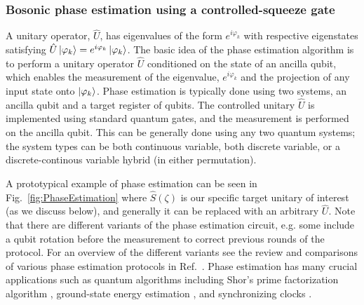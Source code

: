 {
\subsubsection{Bosonic phase estimation using a controlled-squeeze gate}
A unitary operator, $\hat{U}$, has eigenvalues 
 of the form $e^{i\varphi_k}$ with respective eigenstates satisfying $\hat{U}\ket{\varphi_k}=e^{i\varphi_k}\ket{\varphi_k}$. {The basic idea of the phase estimation algorithm is to perform a unitary operator $\hat{U}$ conditioned on the state of an ancilla qubit, which enables the measurement of the eigenvalue, $e^{i\varphi_k}$ and the projection of any input state onto $\ket{\varphi_k}$. Phase estimation is typically done using two systems, an ancilla qubit and a target register of qubits. The controlled unitary $\hat{U}$ is implemented using standard quantum gates, and the measurement is performed on the ancilla qubit.} This can be generally done using any two quantum systems; the system types can be both continuous variable, both discrete variable, or a discrete-continous variable hybrid (in either permutation).}

 {A prototypical example of phase estimation can be seen in Fig.~\ref{fig:PhaseEstimation} where $\hat{S}(\zeta)$ is our specific target unitary of interest (as we discuss below), and generally it can be replaced with an arbitrary $\hat{U}$.  Note that there are different variants of the phase estimation circuit, e.g. some include a qubit rotation before the measurement to correct previous rounds of the protocol. For an overview of the different variants see the review and comparisons of various phase estimation protocols in Ref.~\cite{FastPhaseEstimation}. Phase estimation has many crucial applications such as quantum algorithms \cite{PhaseEstimLinearEq,lloyd2020quantumpolardecompositionalgorithm} including Shor's prime factorization algorithm \cite{ShorFactorization}, ground-state energy estimation \cite{GroundStatePhaseEstim}, and synchronizing clocks \cite{SyncPhaseEstim}.} 
 
